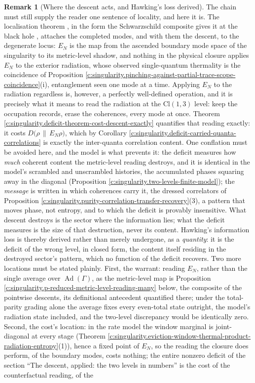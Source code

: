 \documentclass[11pt]{article}
\theoremstyle{definition}
\newtheorem{remark}[theorem]{Remark}
\theoremstyle{plain}
\providecommand{\Cl}{}\renewcommand{\Cl}{\mathrm{Cl}}
\providecommand{\EN}{}\renewcommand{\EN}{E_{N}}
\providecommand{\rel}{}\renewcommand{\rel}[2]{D\bigl(#1 \,\|\, #2\bigr)}
\begin{document}
\begin{remark}[Where the descent acts, and Hawking's loss derived]\label{c:note.singularity.where-descent-acts-hawkings-loss-derived}
The chain must still supply the reader one sentence of locality, and here it is. The localisation theorem \cite[Thm.~4.4, Cor.~4.5]{ButlerT4}, in the form the Schwarzschild composite gives it at the black hole \cite[Thms 8.7, 8.12]{ButlerT4}, attaches the completed modes, and with them the descent, to the degenerate locus: $\EN$ is the map from the ascended boundary mode space of the singularity to its metric-level shadow, and nothing in the physical closure applies $\EN$ to the exterior radiation, whose observed single-quantum thermality is the coincidence of Proposition \ref{c:singularity.pinching-against-partial-trace-scope-coincidence}(i), entanglement seen one mode at a time. Applying $\EN$ to the radiation regardless is, however, a perfectly well-defined operation, and it is precisely what it means to read the radiation at the $\Cl(1,3)$ level: keep the occupation records, erase the coherences, every mode at once. Theorem \ref{c:singularity.deficit-theorem-cost-descent-exactly} quantifies that reading exactly: it costs $\rel{\rho}{\EN\rho}$, which by Corollary \ref{c:singularity.deficit-carried-quanta-correlations} is exactly the inter-quanta correlation content. One conflation must be avoided here, and the model is what prevents it: the deficit measures how \emph{much} coherent content the metric-level reading destroys, and it is identical in the model's scrambled and unscrambled histories, the accumulated phases squaring away in the diagonal (Proposition \ref{c:singularity.two-levels-finite-model}); the \emph{message} is written in which coherences carry it, the dressed correlators of Proposition \ref{c:singularity.purity-correlation-transfer-recovery}(3), a pattern that moves phase, not entropy, and to which the deficit is provably insensitive. What descent destroys is the sector where the information lies; what the deficit measures is the size of that destruction, never its content. Hawking's information loss is thereby derived rather than merely undergone, as a \emph{quantity}: it is the deficit of the wrong level, in closed form, the content itself residing in the destroyed sector's pattern, which no function of the deficit recovers. Two more locations must be stated plainly. First, the warrant: reading $\EN$, rather than the single average over $\operatorname{Ad}(\Gamma)$, as the metric-level map is Proposition \ref{c:singularity.p-reduced-metric-level-reading-many} below, the composite of the pointwise descents, its definitional antecedent quantified there; under the total-parity grading alone the average fixes every even-total state outright, the model's radiation state included, and the two-level discrepancy would be identically zero. Second, the cost's location: in the rate model the window marginal is joint-diagonal at every stage (Theorem \ref{c:singularity.eviction-window-thermal-product-radiation-entropy}(1)), hence a fixed point of $\EN$, so the reading the closure does perform, of the boundary modes, costs nothing; the entire nonzero deficit of the section ``The descent, applied: the two levels in numbers'' is the cost of the counterfactual reading, of the 
\end{remark}
\end{document}
